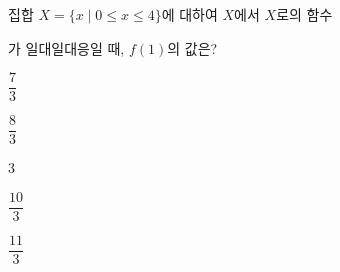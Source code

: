 집합 $X=\{x \mid 0\le x\le 4\}$에 대하여 $X$에서 $X$로의 함수 \par\smallskip{}\par\smallskip\noindent 가 일대일대응일 때, $f(1)$의 값은? 
\begin{choices32}{\rule[-3ex]{0pt}{8ex}$\dfrac{7}{3}$}{\rule[-3ex]{0pt}{8ex}$\dfrac{8}{3}$}{\rule[-3ex]{0pt}{8ex}$3$}{\rule[-3ex]{0pt}{8ex}$\dfrac{10}{3}$}{\rule[-3ex]{0pt}{8ex}$\dfrac{11}{3}$}\end{choices32}
